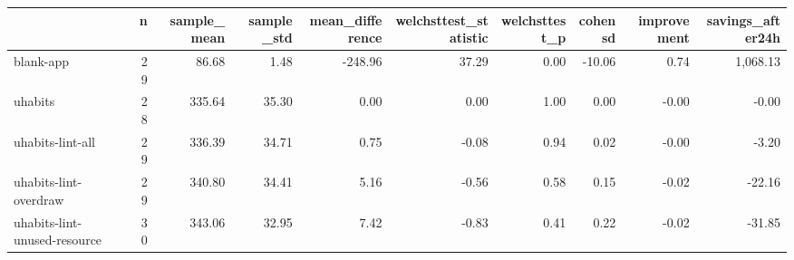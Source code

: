\begin{tabular}{lrrrrrrrrr}
\toprule
{} &   n &  sample\_mean &  sample\_std &  mean\_difference &  welchsttest\_statistic &  welchsttest\_p &  cohensd &  improvement &  savings\_after24h \\
\midrule
blank-app                    &  29 &        86.68 &        1.48 &          -248.96 &                  37.29 &           0.00 &   -10.06 &         0.74 &          1,068.13 \\
uhabits                      &  28 &       335.64 &       35.30 &             0.00 &                   0.00 &           1.00 &     0.00 &        -0.00 &             -0.00 \\
uhabits-lint-all             &  29 &       336.39 &       34.71 &             0.75 &                  -0.08 &           0.94 &     0.02 &        -0.00 &             -3.20 \\
uhabits-lint-overdraw        &  29 &       340.80 &       34.41 &             5.16 &                  -0.56 &           0.58 &     0.15 &        -0.02 &            -22.16 \\
uhabits-lint-unused-resource &  30 &       343.06 &       32.95 &             7.42 &                  -0.83 &           0.41 &     0.22 &        -0.02 &            -31.85 \\
\bottomrule
\end{tabular}
